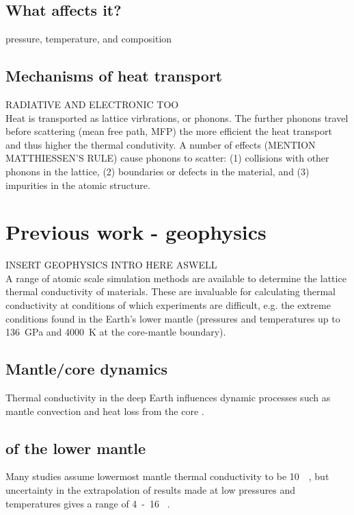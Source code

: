 \subsection{What affects it?}
pressure, temperature, and composition

\subsection{Mechanisms of heat transport}
RADIATIVE AND ELECTRONIC TOO\\

Heat is transported as lattice virbrations, or phonons. The further phonons travel before scattering (mean free path, MFP) the more efficient the heat transport and thus higher the thermal condutivity. A number of effects (MENTION MATTHIESSEN'S RULE) cause phonons to scatter: (1) collisions with other phonons in the lattice, (2) boundaries or defects in the material, and (3) impurities in the atomic structure. 


\section{Previous work - geophysics}
INSERT GEOPHYSICS INTRO HERE ASWELL\\

A range of atomic scale simulation methods are available to determine the lattice thermal conductivity of materials. These are invaluable for calculating thermal conductivity at conditions of which experiments are difficult, e.g. the extreme conditions found in the Earth's lower mantle (pressures and temperatures up to 136~GPa and 4000~K at the core-mantle boundary). 

\subsection{Mantle/core dynamics}
Thermal conductivity in the deep Earth influences dynamic processes such as mantle convection and heat loss from the core \citep{Lay2008}.

\subsection{\Tc of the lower mantle}
Many studies assume lowermost mantle thermal conductivity to be 10~\wmk~\citep[e.g.][]{Lay2008}, but uncertainty in the extrapolation of results made at low pressures and temperatures gives a range of 4~-~16 \wmk~\citep{Brown1986, Osako1991, Hofmeister1999, Goncharov2009, Manthilake2011, Ohta2012}.

